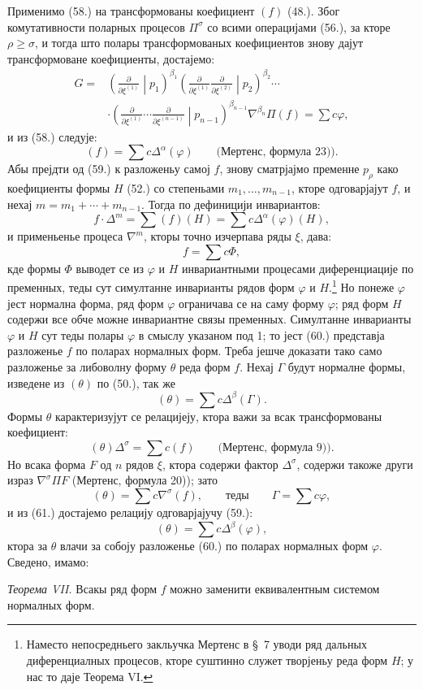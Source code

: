 ﻿\documentclass[11pt]{article}
\begin{document}
Применимо (58.) на трансформованы коефициент $(f)$ (48.). Због комутативности поларных процесов $\Pi^\sigma$ со всими операцијами (56.), за кторе $\rho\ge\sigma$, и тогда што полары трансформованых коефициентов знову дајут трансформоване коефициенты, достајемо:
\[
\begin{aligned}
G={}&\left(\frac{\partial}{\partial\xi^{(1)}}\middle|p_1\right)^{\beta_1}
\left(\frac{\partial}{\partial\xi^{(1)}}\frac{\partial}{\partial\xi^{(2)}}\middle|p_2\right)^{\beta_2}\cdots\\
&\cdot
\left(\frac{\partial}{\partial\xi^{(1)}}\cdots\frac{\partial}{\partial\xi^{(n-1)}}\middle|p_{n-1}\right)^{\beta_{n-1}}
\nabla^{\beta_n}\Pi(f)=\sum c\varphi,
\end{aligned}
\]
и из (58.) следује:
\begin{equation}
 (f)=\sum c\Delta^\alpha(\varphi)\qquad\text{(Мертенс, формула 23)).}
\tag{59}
\end{equation}
Абы прејдти од (59.) к разложеньу самој $f$, знову сматрјајмо пременне $p_\rho$ како коефициенты формы $H$ (52.) со степеньами $m_1,\ldots,m_{n-1}$, кторе одговарјајут $f$, и нехај $m=m_1+\cdots+m_{n-1}$. Тогда по дефиницији инвариантов:
\[
 f\cdot\Delta^m=\sum(f)(H)=\sum c\Delta^\alpha(\varphi)(H),
\]
и применьенье процеса $\nabla^m$, кторы точно изчерпава ряды $\xi$, дава:
\begin{equation}
 f=\sum c\Phi,
\tag{60}
\end{equation}
кде формы $\Phi$ выводет се из $\varphi$ и $H$ инвариантными процесами диференциације по пременных, теды сут симултанне инварианты рядов форм $\varphi$ и $H$.\footnote{Наместо непосредньего закльучка Мертенс в \S\ 7 уводи ряд дальных диференциалных процесов, кторе суштинно служет творјеньу реда форм $H$; у нас то даје Теорема VI.} Но понеже $\varphi$ јест нормална форма, ряд форм $\varphi$ ограничава се на саму форму $\varphi$; ряд форм $H$ содержи все обче можне инвариантне связы пременных. Симултанне инварианты $\varphi$ и $H$ сут теды полары $\varphi$ в смыслу указаном под 1; то јест (60.) представја разложенье $f$ по поларах нормалных форм. Треба јешче доказати тако само разложенье за либоволну форму $\theta$ реда форм $f$. Нехај $\Gamma$ будут нормалне формы, изведене из $(\theta)$ по (50.), так же
\begin{equation}
 (\theta)=\sum c\Delta^\beta(\Gamma).
\tag{61}
\end{equation}
Формы $\theta$ карактеризујут се релацијеју, ктора важи за всак трансформованы коефициент:
\[
 (\theta)\Delta^\sigma=\sum c(f)\qquad\text{(Мертенс, формула 9)).}
\]
Но всака форма $F$ од $n$ рядов $\xi$, ктора содержи фактор $\Delta^\sigma$, содержи такоже други израз $\nabla^\sigma\Pi F$ (Мертенс, формула 20)); зато
\[
 (\theta)=\sum c\nabla^\sigma(f),\qquad\text{теды}\qquad \Gamma=\sum c\varphi,
\]
и из (61.) достајемо релацију одговарјајучу (59.):
\[
 (\theta)=\sum c\Delta^\beta(\varphi),
\]
ктора за $\theta$ влачи за собоју разложенье (60.) по поларах нормалных форм $\varphi$. Сведено, имамо:

\emph{Теорема VII.} Всакы ряд форм $f$ можно заменити еквивалентным системом нормалных форм.
\end{document}
